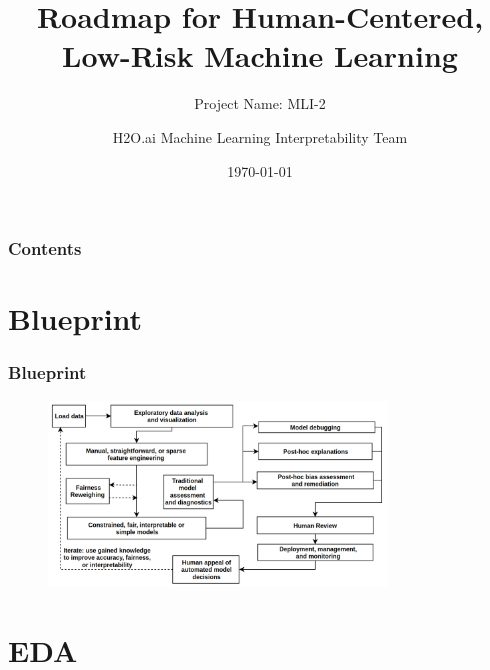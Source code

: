 \documentclass[11pt,
               aspectratio=169,
               hyperref={colorlinks}
               ]{beamer}
\author{H2O.ai Machine Learning Interpretability Team}
\title{Roadmap for Human-Centered, Low-Risk Machine Learning}
\subtitle{Project Name: MLI-2}
\institute{\href{https://www.h2o.ai}{H\textsubscript{2}O.ai}}
\date{\today}
\begin{document}
	
	\maketitle
	
	\begin{frame}
	
		\frametitle{Contents}
		
		\tableofcontents{}
		
	\end{frame}

	\section{Blueprint}
	
		\begin{frame}
		
			\frametitle{Blueprint}
				
			\begin{figure}[htb]
				\begin{center}
					\includegraphics[height=140pt]{img/blueprint.png}
					\label{fig:blueprint}
				\end{center}
			\end{figure}		
		
		\end{frame}


	\section{EDA}
	
\end{document}
